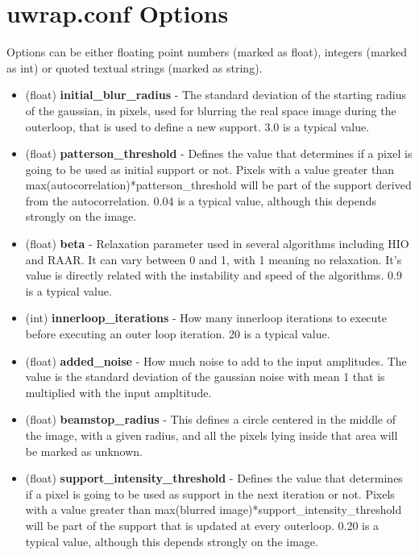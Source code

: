 \documentclass{report}
\begin{document}
\section{uwrap.conf Options}

Options can be either floating point numbers (marked as float), integers (marked as int) or quoted textual strings (marked as string).
 

\begin{itemize}
\item (float) \textbf{initial\_blur\_radius} - The standard deviation of the starting radius of the gaussian, in pixels, used for blurring
the real space image during the outerloop, that is used to define a new support. 3.0 is a typical value.


\item (float) \textbf{patterson\_threshold} - Defines the value that determines if a pixel is going to be used as initial support or not. Pixels with
a value greater than max(autocorrelation)*patterson\_threshold will be part of the support derived from the autocorrelation. 0.04 is a
typical value, although this depends strongly on the image.


\item (float) \textbf{beta} - Relaxation parameter used in several algorithms including HIO and RAAR. It can vary between 0 and 1, with 1 meaning
no relaxation. It's value is directly related with the instability and speed of the algorithms. 0.9 is a typical value.


\item (int) \textbf{innerloop\_iterations} - How many innerloop iterations to execute before executing an outer loop iteration. 20 is a typical value.


\item (float) \textbf{added\_noise} - How much noise to add to the input amplitudes. The value is the standard deviation of the gaussian noise with
mean 1 that is multiplied with the input ampltitude.

\item (float) \textbf{beamstop\_radius} - This defines a circle centered in the middle of the image, with a given radius, and all the pixels lying inside
that area will be marked as unknown.


\item (float) \textbf{support\_intensity\_threshold} - Defines the value that determines if a pixel is going to be used as support in the next iteration or not. 
Pixels with a value greater than max(blurred image)*support\_intensity\_threshold will be part of the support that is updated at every outerloop.
0.20 is a typical value, although this depends strongly on the image.



\end{itemize}
\end{document}
